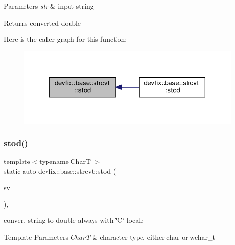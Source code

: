 \begin{DoxyParams}{Parameters}
{\em str} & input string \\
\hline
\end{DoxyParams}
\begin{DoxyReturn}{Returns}
converted double 
\end{DoxyReturn}
Here is the caller graph for this function\+:
\nopagebreak
\begin{figure}[H]
\begin{center}
\leavevmode
\includegraphics[width=318pt]{structdevfix_1_1base_1_1strcvt_a63350be05c30f4cffee9d8dc8eed54d5_icgraph}
\end{center}
\end{figure}
\mbox{\label{structdevfix_1_1base_1_1strcvt_aec0faa61c87e1206ef3a50d5bb197fe7}} 
\subsubsection{\texorpdfstring{stod()}{stod()}\hspace{0.1cm}{\footnotesize\ttfamily [2/2]}}
{\footnotesize\ttfamily template$<$typename CharT $>$ \\
static auto devfix\+::base\+::strcvt\+::stod (\begin{DoxyParamCaption}\item[{std\+::basic\+\_\+string\+\_\+view$<$ CharT $>$}]{sv }\end{DoxyParamCaption})\hspace{0.3cm}{\ttfamily [inline]}, {\ttfamily [static]}}



convert string to double always with \char`\"{}\+C\char`\"{} locale 


\begin{DoxyTemplParams}{Template Parameters}
{\em CharT} & character type, either \textquotesingle{}char\textquotesingle{} or \textquotesingle{}wchar\+\_\+t\textquotesingle{} \\
\hline
\end{DoxyTemplParams}

